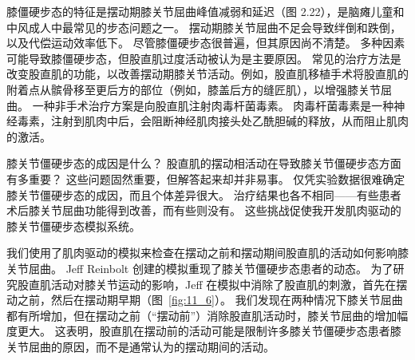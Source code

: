 膝僵硬步态的特征是摆动期膝关节屈曲峰值减弱和延迟（图 2.22），是脑瘫儿童和中风成人中最常见的步态问题之一。
摆动期膝关节屈曲不足会导致绊倒和跌倒，以及代偿运动效率低下。
尽管膝僵硬步态很普遍，但其原因尚不清楚。
多种因素可能导致膝僵硬步态，但股直肌过度活动被认为是主要原因。
常见的治疗方法是改变股直肌的功能，以改善摆动期膝关节活动。例如，股直肌移植手术将股直肌的附着点从髌骨移至更后方的部位（例如，膝盖后方的缝匠肌），以增强膝关节屈曲。
一种非手术治疗方案是向股直肌注射肉毒杆菌毒素。
肉毒杆菌毒素是一种神经毒素，注射到肌肉中后，会阻断神经肌肉接头处乙酰胆碱的释放，从而阻止肌肉的激活。


膝关节僵硬步态的成因是什么？
股直肌的摆动相活动在导致膝关节僵硬步态方面有多重要？
这些问题固然重要，但解答起来却并非易事。
仅凭实验数据很难确定膝关节僵硬步态的成因，而且个体差异很大。
治疗结果也各不相同——有些患者术后膝关节屈曲功能得到改善，而有些则没有。
这些挑战促使我开发肌肉驱动的膝关节僵硬步态模拟系统。


我们使用了肌肉驱动的模拟来检查在摆动之前和摆动期间股直肌的活动如何影响膝关节屈曲。
Jeff Reinbolt 创建的模拟重现了膝关节僵硬步态患者的动态。
为了研究股直肌活动对膝关节运动的影响，Jeff 在模拟中消除了股直肌的刺激，首先在摆动之前，然后在摆动期早期（图~\ref{fig:11_6}）。
我们发现在两种情况下膝关节屈曲都有所增加，但在摆动之前（“摆动前”）消除股直肌活动时，膝关节屈曲的增加幅度更大。
这表明，股直肌在摆动前的活动可能是限制许多膝关节僵硬步态患者膝关节屈曲的原因，而不是通常认为的摆动期间的活动。


